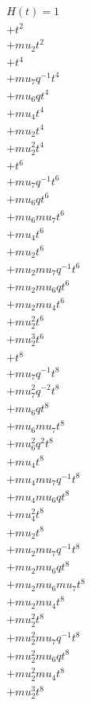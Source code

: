 \begin{align*}
H(t) = {}1 \\
  + t^{2} \\
  + mu_2 t^{2} \\
  + t^{4} \\
  + mu_7 q^{-1} t^{4} \\
  + mu_6 q t^{4} \\
  + mu_4 t^{4} \\
  + mu_2 t^{4} \\
  + mu_2^{2} t^{4} \\
  + t^{6} \\
  + mu_7 q^{-1} t^{6} \\
  + mu_6 q t^{6} \\
  + mu_6 mu_7 t^{6} \\
  + mu_4 t^{6} \\
  + mu_2 t^{6} \\
  + mu_2 mu_7 q^{-1} t^{6} \\
  + mu_2 mu_6 q t^{6} \\
  + mu_2 mu_4 t^{6} \\
  + mu_2^{2} t^{6} \\
  + mu_2^{3} t^{6} \\
  + t^{8} \\
  + mu_7 q^{-1} t^{8} \\
  + mu_7^{2} q^{-2} t^{8} \\
  + mu_6 q t^{8} \\
  + mu_6 mu_7 t^{8} \\
  + mu_6^{2} q^{2} t^{8} \\
  + mu_4 t^{8} \\
  + mu_4 mu_7 q^{-1} t^{8} \\
  + mu_4 mu_6 q t^{8} \\
  + mu_4^{2} t^{8} \\
  + mu_2 t^{8} \\
  + mu_2 mu_7 q^{-1} t^{8} \\
  + mu_2 mu_6 q t^{8} \\
  + mu_2 mu_6 mu_7 t^{8} \\
  + mu_2 mu_4 t^{8} \\
  + mu_2^{2} t^{8} \\
  + mu_2^{2} mu_7 q^{-1} t^{8} \\
  + mu_2^{2} mu_6 q t^{8} \\
  + mu_2^{2} mu_4 t^{8} \\
  + mu_2^{3} t^{8} \\

\end{align*}
